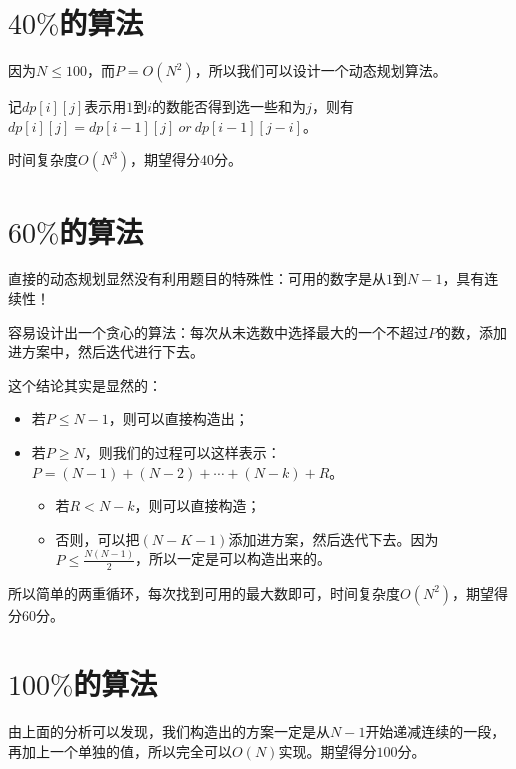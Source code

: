 \documentclass[a4paper]{article}
\begin{document}
\section{$40\%$的算法}
因为$N \le 100$，而$P = O(N^2)$，所以我们可以设计一个动态规划算法。 \par
记$dp[i][j]$表示用$1$到$i$的数能否得到选一些和为$j$，则有$dp[i][j] = dp[i - 1][j]\ or\ dp[i - 1][j - i]$。 \par
时间复杂度$O(N^3)$，期望得分$40$分。

\section{$60\%$的算法}
直接的动态规划显然没有利用题目的特殊性：可用的数字是从$1$到$N-1$，具有连续性！ \par
容易设计出一个贪心的算法：每次从未选数中选择最大的一个不超过$P$的数，添加进方案中，然后迭代进行下去。 \par
这个结论其实是显然的：
\begin{itemize}
\item 若$P \le N - 1$，则可以直接构造出；
\item 若$P \ge N$，则我们的过程可以这样表示：$P=(N-1)+(N-2)+\cdots+(N-k)+R$。
\begin{itemize}
\item 若$R < N - k$，则可以直接构造；
\item 否则，可以把$(N - K - 1)$添加进方案，然后迭代下去。因为$P \le \frac{N(N-1)}{2}$，所以一定是可以构造出来的。
\end{itemize}
\end{itemize}
\par
所以简单的两重循环，每次找到可用的最大数即可，时间复杂度$O(N^2)$，期望得分$60$分。

\section{$100\%$的算法}
由上面的分析可以发现，我们构造出的方案一定是从$N-1$开始递减连续的一段，再加上一个单独的值，所以完全可以$O(N)$实现。期望得分$100$分。
\end{document}
